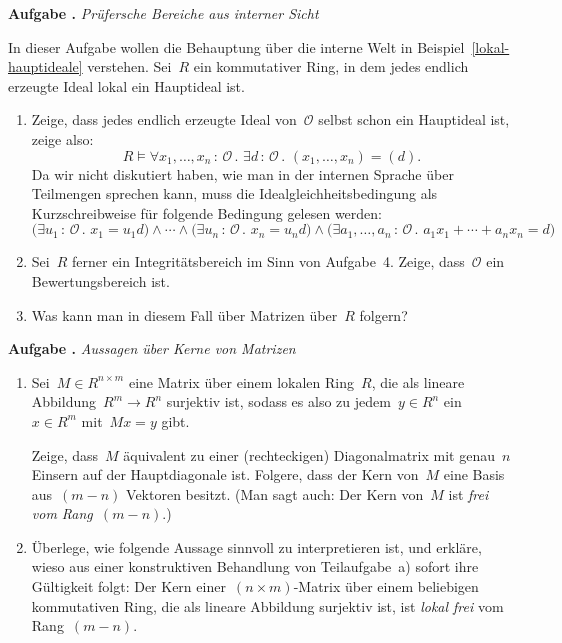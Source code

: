 \documentclass[a4paper,ngerman,12pt]{scrartcl}
\theoremstyle{definition}
\theoremstyle{plain}
\theoremstyle{remark}
\renewcommand{\O}{\mathcal{O}}
\renewcommand{\_}{\mathpunct{.}\,}
\newcommand{\?}{\,{:}\,}
\newlength{\aufgabenskip}
\newcounter{aufgabennummer}
\newenvironment{aufgabe}[1]{
  \addtocounter{aufgabennummer}{1}
  \textbf{Aufgabe \theaufgabennummer{}.} \emph{#1} \par
}{\vspace{\aufgabenskip}}
\begin{document}
\begin{aufgabe}{Prüfersche Bereiche aus interner Sicht}
In dieser Aufgabe wollen die Behauptung über die interne Welt in
Beispiel~\ref{lokal-hauptideale} verstehen.
Sei~$R$ ein kommutativer Ring, in dem jedes
endlich erzeugte Ideal lokal ein Hauptideal ist.
\begin{enumerate}
\item Zeige, dass jedes endlich
erzeugte Ideal von~$\O$ selbst schon ein Hauptideal ist, zeige also:
\[ R \models
  \forall x_1,\ldots,x_n\?\O\_
  \exists d\?\O\_
  (x_1,\ldots,x_n) = (d). \]
Da wir nicht diskutiert haben, wie man in der internen Sprache über Teilmengen
sprechen kann, muss die Idealgleichheitsbedingung als Kurzschreibweise für
folgende Bedingung gelesen werden:
\[
  \bigl(\exists u_1\?\O\_ x_1 = u_1 d\bigr) \wedge
  \cdots \wedge
  \bigl(\exists u_n\?\O\_ x_n = u_n d\bigr) \wedge
  \bigl(\exists a_1,\ldots,a_n\?\O\_ a_1 x_1 + \cdots + a_n x_n = d\bigr)
\]
\item Sei~$R$ ferner ein Integritätsbereich im Sinn von Aufgabe~4. Zeige,
dass~$\O$ ein Bewertungsbereich ist.
\item Was kann man in diesem Fall über Matrizen über~$R$ folgern?
\end{enumerate}
\end{aufgabe}

\begin{aufgabe}{Aussagen über Kerne von Matrizen}
\begin{enumerate}
\item Sei~$M \in R^{n \times m}$ eine Matrix über einem lokalen Ring~$R$, die
als lineare Abbildung~$R^m \to R^n$ surjektiv ist, sodass es also zu jedem~$y
\in R^n$ ein~$x \in R^m$ mit~$Mx = y$ gibt.

Zeige, dass~$M$ äquivalent zu einer (rechteckigen) Diagonalmatrix mit genau~$n$
Einsern auf der Hauptdiagonale ist. Folgere, dass der Kern von~$M$ eine Basis
aus~$(m - n)$ Vektoren besitzt. (Man sagt auch: Der Kern von~$M$ ist \emph{frei
vom Rang~$(m-n)$}.)

\item Überlege, wie folgende Aussage sinnvoll zu interpretieren ist, und
erkläre, wieso aus einer konstruktiven Behandlung von Teilaufgabe~a) sofort
ihre Gültigkeit folgt:
Der Kern einer~$(n \times m)$-Matrix über einem beliebigen kommutativen
Ring, die als lineare Abbildung surjektiv ist, ist \emph{lokal frei} vom
Rang~$(m-n)$.
\end{enumerate}
\end{aufgabe}
\end{document}
